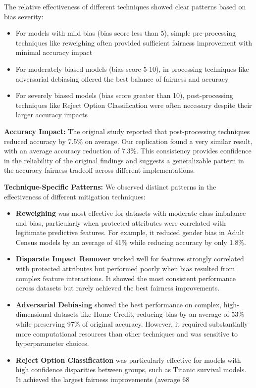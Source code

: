 \documentclass[10pt,journal,compsoc]{IEEEtran}
\begin{document}
The relative effectiveness of different techniques showed clear patterns based on bias severity:
\begin{itemize}
\item For models with mild bias (bias score less than 5), simple pre-processing techniques like reweighing often provided sufficient fairness improvement with minimal accuracy impact
\item For moderately biased models (bias score 5-10), in-processing techniques like adversarial debiasing offered the best balance of fairness and accuracy
\item For severely biased models (bias score greater than 10), post-processing techniques like Reject Option Classification were often necessary despite their larger accuracy impacts
\end{itemize}

\textbf{Accuracy Impact:} The original study reported that post-processing techniques reduced accuracy by 7.5\% on average. Our replication found a very similar result, with an average accuracy reduction of 7.3\%. This consistency provides confidence in the reliability of the original findings and suggests a generalizable pattern in the accuracy-fairness tradeoff across different implementations.

\textbf{Technique-Specific Patterns:} We observed distinct patterns in the effectiveness of different mitigation techniques:
\begin{itemize}
\item \textbf{Reweighing} was most effective for datasets with moderate class imbalance and bias, particularly when protected attributes were correlated with legitimate predictive features. For example, it reduced gender bias in Adult Census models by an average of 41\% while reducing accuracy by only 1.8\%.

\item \textbf{Disparate Impact Remover} worked well for features strongly correlated with protected attributes but performed poorly when bias resulted from complex feature interactions. It showed the most consistent performance across datasets but rarely achieved the best fairness improvements.

\item \textbf{Adversarial Debiasing} showed the best performance on complex, high-dimensional datasets like Home Credit, reducing bias by an average of 53\% while preserving 97\% of original accuracy. However, it required substantially more computational resources than other techniques and was sensitive to hyperparameter choices.

\item \textbf{Reject Option Classification} was particularly effective for models with high confidence disparities between groups, such as Titanic survival models. It achieved the largest fairness improvements (average 68%
\end{itemize}
\end{document}
